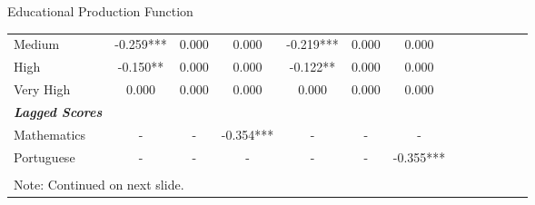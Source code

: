 \documentclass{beamer}
\begin{document}
\begin{frame}{Educational Production Function}
\begin{table}
\begin{adjustbox}{max width=\textwidth}
\begin{tabular}{l*{6}{cc}}
Medium              &      -0.259***&       0.000   &       0.000   &      -0.219***&       0.000   &       0.000   \\
High                &      -0.150** &       0.000   &       0.000   &      -0.122** &       0.000   &       0.000   \\
Very High           &       0.000   &       0.000   &       0.000   &       0.000   &       0.000   &       0.000   \\
\textbf{\emph{Lagged Scores}}&               &               &               &               &               &               \\
Mathematics         &     -          &              - &      -0.354***         &      -         &       -        &         -      \\
Portuguese          &      -         &       -        &     -          &      -         &        -       &              -0.355*** \\
\bottomrule
\vspace{-18pt} \\
\multicolumn{7}{l}{\tiny Note: Continued on next slide.}\\
\end{tabular}
\end{adjustbox}
\end{table}
\end{frame}
\end{document}
